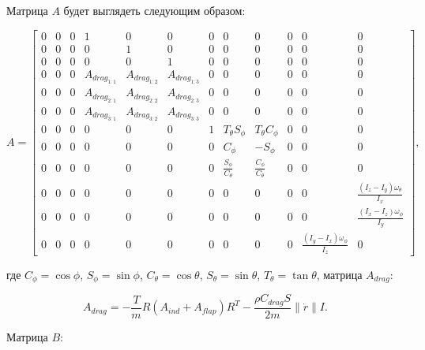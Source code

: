 \newpage
Матрица \(A\) будет выглядеть следующим образом:

\begin{equation}
    A=
\begin{bmatrix}
    0 & 0 & 0 & 1 & 0 & 0 & 0 & 0 & 0 & 0 & 0 & 0 \\
    0 & 0 & 0 & 0 & 1 & 0 & 0 & 0 & 0 & 0 & 0 & 0 \\
    0 & 0 & 0 & 0 & 0 & 1 & 0 & 0 & 0 & 0 & 0 & 0 \\
    0 & 0 & 0 & A_{drag_{1:1}} & A_{drag_{1:2}} & A_{drag_{1:3}} & 0 & 0 & 0 & 0 & 0 & 0 \\
    0 & 0 & 0 & A_{drag_{2:1}} & A_{drag_{2:2}} & A_{drag_{2:3}} & 0 & 0 & 0 & 0 & 0 & 0 \\
    0 & 0 & 0 & A_{drag_{3:1}} & A_{drag_{3:2}} & A_{drag_{3:3}} & 0 & 0 & 0 & 0 & 0 & 0 \\
    0 & 0 & 0 & 0 & 0 & 0 & 1 & T_\theta S_\phi & T_\theta C_\phi & 0 & 0 & 0 \\
    0 & 0 & 0 & 0 & 0 & 0 & 0 & C_\phi & -S_\phi & 0 & 0 & 0 \\
    0 & 0 & 0 & 0 & 0 & 0 & 0 & \frac{S_\phi}{C_\theta} & \frac{C_\phi}{C_\theta} & 0 & 0 & 0 \\
    0 & 0 & 0 & 0 & 0 & 0 & 0 & 0 & 0 & 0 & 0 & \frac{(I_z - I_y)\omega_{\theta}}{I_x} \\
    0 & 0 & 0 & 0 & 0 & 0 & 0 & 0 & 0 & 0 & 0 & \frac{(I_x - I_z)\omega_{\phi}}{I_y} \\
    0 & 0 & 0 & 0 & 0 & 0 & 0 & 0 & 0 & 0 & \frac{(I_y - I_x)\omega_{\phi}}{I_z} & 0
\end{bmatrix},
\end{equation}


где \(C_\phi = \cos\phi\), \(S_\phi = \sin\phi\), \(C_\theta = \cos\theta\), \(S_\theta = \sin\theta\),
\(T_\theta = \tan\theta\), матрица \(A_{drag}\):

\begin{equation}
A_{drag} = -\frac{T}{m} R (A_{ind} + A_{flap}) R^T - \frac{\rho C_{drag} S}{2m} \|\dot{r}\| I
.\end{equation}

Матрица \(B\):

